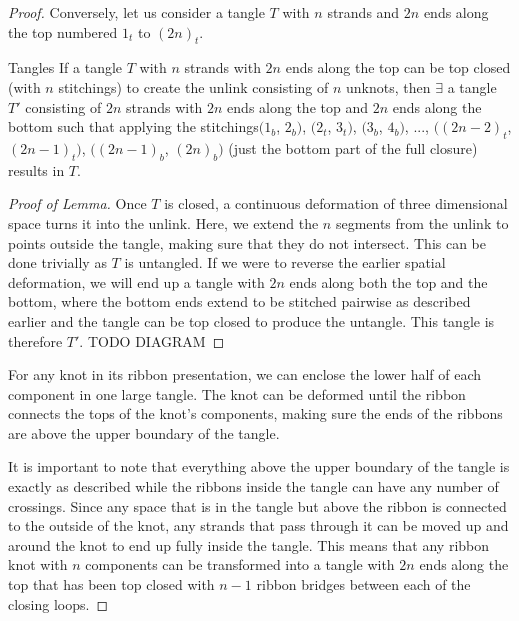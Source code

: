 \begin{paper}
\begin{proof}
Conversely, let us consider a tangle $T$ with $n$ strands and $2n$ ends along
the top numbered $1_t$ to $(2n)_t$.
\begin{paperlemma}{Tangles}
If a tangle $T$ with $n$ strands with $2n$ ends along the top can be top closed
(with $n$ stitchings) to create the unlink consisting of $n$ unknots, then
$\exists$ a tangle $T'$ consisting of $2n$ strands with $2n$ ends along the top
and $2n$ ends along the bottom such that applying the stitchings$(1_b$, $2_b)$,
$(2_t$, $3_t)$, $(3_b$, $4_b)$, $...$, $((2n-2)_t$, $(2n-1)_t)$, $((2n-1)_b$,
$(2n)_b)$ (just the bottom part of the full closure) results in $T$.

\end{paperlemma}
\begin{proof}[Proof of Lemma]
Once $T$ is closed, a continuous deformation of three dimensional space turns it
into the unlink.
Here, we extend the $n$ segments from the unlink to points outside the tangle,
making sure that they do not intersect.
This can be done trivially as $T$ is untangled.
If we were to reverse the earlier spatial deformation, we will end up a tangle
with $2n$ ends along both the top and the bottom, where the bottom ends extend
to be stitched pairwise as described earlier and the tangle can be top closed to
produce the untangle.
This tangle is therefore $T'$.
TODO DIAGRAM
\end{proof}
For any knot in its ribbon presentation, we can enclose the lower half of each
component in one large tangle.
The knot can be deformed until the ribbon connects the tops of the knot's
components, making sure the ends of the ribbons are above the upper boundary of
the tangle.


It is important to note that everything above the upper boundary of the tangle
is exactly as described while the ribbons inside the tangle can have any number
of crossings.
Since any space that is in the tangle but above the ribbon is connected to the
outside of the knot, any strands that pass through it can be moved up and around
the knot to end up fully inside the tangle.
This means that any ribbon knot with $n$ components can be transformed into a
tangle with $2n$ ends along the top that has been top closed with $n-1$ ribbon
bridges between each of the closing loops.


\end{proof}
\end{paper}
